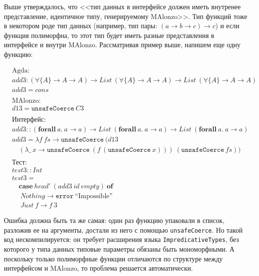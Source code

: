 Выше утверждалось, что <<тип данных в интерфейсе должен иметь внутренее представление,
идентичное типу, генерируемому MAlonzo>>. Тип функций тоже в некотором роде тип данных
(например, тип пары: \((a \rightarrow b \rightarrow c) \rightarrow c\)) и если функция
полиморфна, то этот тип будет иметь разные представления в интерфейсе и внутри MAlonzo.
Рассматривая пример выше, напишем еще одну функцию:

\begin{align*}
&\text{Agda:}\\
&add3 : (\forall \{A\} \rightarrow A \rightarrow A) \rightarrow List\ (\forall \{A\}
   \rightarrow A \rightarrow A) \rightarrow List\ (\forall \{A\} \rightarrow A
   \rightarrow A)\\
&add3 = cons\\
\\
&\text{MAlonzo:}\\
&d13 = \texttt{unsafeCoerce}\ C3\\
\\
&\text{Интерфейс:}\\
&add3 :: (\mathbf{forall}\ a.\ a \rightarrow a) \rightarrow
   List\ (\mathbf{forall}\ a.\ a \rightarrow a) \rightarrow
   List\ (\mathbf{forall}\ a.\ a \rightarrow a)\\
&add3 = \lambda f\ fs \rightarrow \texttt{unsafeCoerce}\ (d13\\
&\quad(\lambda \_\ x \rightarrow \texttt{unsafeCoerce}\ (
      f\ (\texttt{unsafeCoerce}\ x)))
   \ (\texttt{unsafeCoerce}\ fs))\\
\\
&\text{Тест:}\\
&test3 :: Int\\
&test3 =\\
&\quad\mathbf{case}\ head'\ (add3\ id\ empty)\ \mathbf{of}\\
&\quad\ Nothing \rightarrow \texttt{error}\ \text{``Impossible''}\\
&\quad\ Just\ f \rightarrow f\ 3
\end{align*}

Ошибка должна быть та же самая: один раз функцию упаковали в список, разложив ее
на аргументы, достали из него с помощью \texttt{unsafeCoerce}. Но такой код
нескомпилируется: он требует расширения языка \texttt{ImpredicativeTypes},
без которого у типа данных типовые параметры обязаны быть мономорфными\cite{SPJ11}. А поскольку
только полиморфные функции отличаются по структуре между интерфейсом и MAlonzo,
то проблема решается автоматически.

